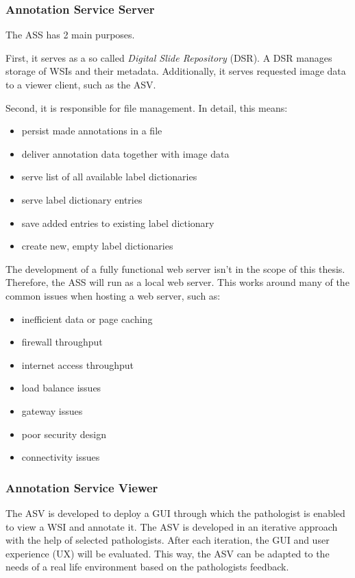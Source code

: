 \subsubsection{Annotation Service Server}
The ASS has 2 main purposes.

First, it serves as a so called \emph{Digital Slide Repository} (DSR). A DSR manages storage of WSIs and their metadata. Additionally, it serves requested image data to a viewer client\cite{Cornish13}, such as the ASV. 

Second, it is responsible for file management. In detail, this means:
\begin{itemize}
	\item persist made annotations in a file
	\item deliver annotation data together with image data
	\item serve list of all available label dictionaries
	\item serve label dictionary entries
	\item save added entries to existing label dictionary
	\item create new, empty label dictionaries
\end{itemize} 

The development of a fully functional web server isn't in the scope of this thesis. Therefore, the ASS will run as a local web server. This works around many of the common issues when hosting a web server\cite{web:typicalissues}, such as:

\begin{itemize}
	\item inefficient data or page caching
	\item firewall throughput
	\item internet access throughput
	\item load balance issues
	\item gateway issues
	\item poor security design
	\item connectivity issues
\end{itemize}


\subsubsection{Annotation Service Viewer}
The ASV is developed to deploy a GUI through which the pathologist is enabled to view a WSI and annotate it. The ASV is developed in an iterative approach with the help of selected pathologists. After each iteration, the GUI and user experience (UX) will be evaluated. This way, the ASV can be adapted to the needs of a real life environment based on the pathologists feedback.

